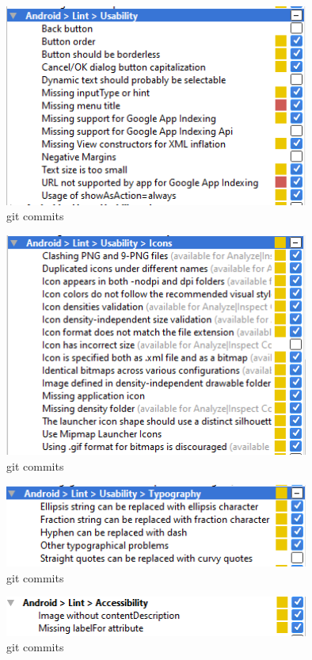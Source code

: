\begin{figure}[H]
  		\centering
      	\includegraphics[width=100mm]{Capture7}	      	
  		\caption{git commits}
\end{figure}

\begin{figure}[H]
  		\centering
      	\includegraphics[width=100mm]{Capture8}	      	
  		\caption{git commits}
\end{figure}

\begin{figure}[H]
  		\centering
      	\includegraphics[width=100mm]{Capture9}	      	
  		\caption{git commits}
\end{figure}

\begin{figure}[H]
  		\centering
      	\includegraphics[width=100mm]{Capture10}	      	
  		\caption{git commits}
\end{figure}


